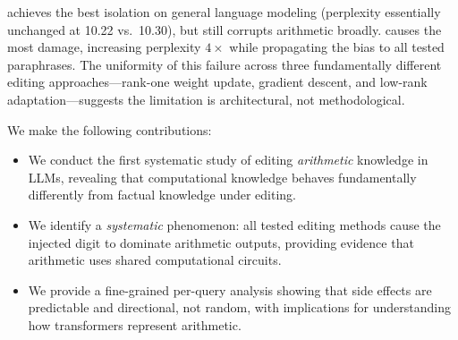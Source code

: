 \rome achieves the best isolation on general language modeling (perplexity essentially unchanged at 10.22 vs.\ 10.30), but still corrupts arithmetic broadly.
\lora causes the most damage, increasing perplexity $4\times$ while propagating the bias to all tested paraphrases.
The uniformity of this failure across three fundamentally different editing approaches---rank-one weight update, gradient descent, and low-rank adaptation---suggests the limitation is architectural, not methodological.

We make the following contributions:
\begin{itemize}[leftmargin=*,itemsep=0pt,topsep=0pt]
    \item We conduct the first systematic study of editing \emph{arithmetic} knowledge in LLMs, revealing that computational knowledge behaves fundamentally differently from factual knowledge under editing.
    \item We identify a \emph{systematic} \fivebias phenomenon: all tested editing methods cause the injected digit to dominate arithmetic outputs, providing evidence that arithmetic uses shared computational circuits.
    \item We provide a fine-grained per-query analysis showing that side effects are predictable and directional, not random, with implications for understanding how transformers represent arithmetic.
\end{itemize}

